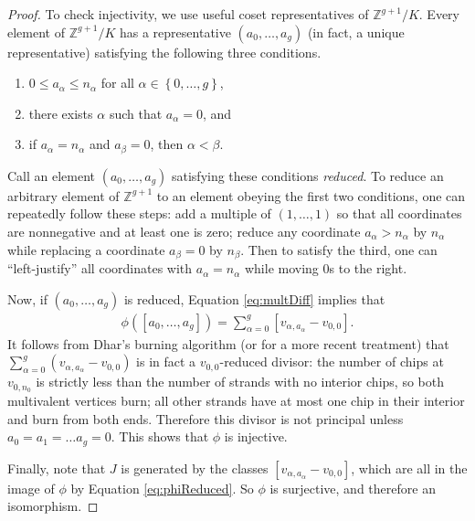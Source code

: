 \documentclass[11pt]{article}
\theoremstyle{definition}
\numberwithin{equation}{section}
\newcommand{\Z}{\mathbb{Z}}
\newcommand{\set}[1]{\left\{{#1}\right\}}
\begin{document}
\begin{proof}
    To check injectivity, we use useful coset representatives of $\Z^{g+1}/K$. Every element of $\Z^{g+1}/K$ has a representative $(a_0,\dots,a_g)$ (in fact, a unique representative) satisfying the following three conditions.
    \begin{enumerate}[label = \arabic*)]
        \item $0\leq a_\alpha \leq n_\alpha$ for all $\alpha \in \set{0,\dots,g}$,
        \item there exists $\alpha$ such that $a_\alpha = 0$, and
        \item if $a_\alpha = n_\alpha$ and $a_\beta = 0$, then $\alpha < \beta$.
    \end{enumerate}
    Call an element $(a_0, \ldots, a_g)$ satisfying these conditions \emph{reduced}.
    To reduce an arbitrary element of $\Z^{g+1}$ to an element obeying the first two conditions, one can repeatedly follow these steps: add a multiple of $(1,\ldots,1)$ so that all coordinates are nonnegative and at least one is zero; reduce any coordinate $a_\alpha > n_\alpha$ by $n_\alpha$ while replacing a coordinate $a_\beta = 0$ by $n_\beta$. Then to satisfy the third, one can ``left-justify'' all coordinates with $a_\alpha = n_\alpha$ while moving $0$s to the right.
    
    Now, if $(a_0, \ldots, a_g)$ is reduced, Equation \eqref{eq:multDiff} implies that
    \begin{align} \label{eq:phiReduced}
    \phi( [a_0, \ldots, a_g]) = \sum_{\alpha=0}^g [ v_{\alpha, a_\alpha} - v_{0,0} ].
    \end{align}
    It follows from Dhar's burning algorithm \cite{Dhar90} (or \cite[\S 3.4]{corry2018divisors} for a more recent treatment) that $\sum_{\alpha=0}^g (v_{\alpha, a_\alpha} - v_{0,0})$ is in fact a $v_{0,0}$-reduced divisor: the number of chips at $v_{0,n_0}$ is strictly less than the number of strands with no interior chips, so both multivalent vertices burn; all other strands have at most one chip in their interior and burn from both ends. Therefore this divisor is not principal unless $a_0 = a_1 = \ldots a_g = 0$. This shows that $\phi$ is injective. 
    
    Finally, note that $J$ is generated by the classes $[v_{\alpha,a_\alpha} - v_{0,0}]$, which are all in the image of $\phi$ by Equation \eqref{eq:phiReduced}. So $\phi$ is surjective, and therefore an isomorphism.
\end{proof}
\end{document}
